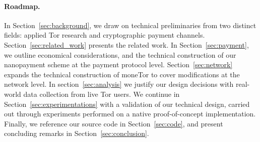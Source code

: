 \paragraph*{Roadmap.} In Section~\ref{sec:background}, we draw on technical
preliminaries from two distinct fields: applied Tor research and cryptographic
payment channels. Section~\ref{sec:related_work} presents the related work.
In Section~\ref{sec:payment}, we outline economical considerations, and the technical construction of
our nanopayment scheme at the payment protocol level. Section~\ref{sec:network}
expands the technical construction of moneTor to cover modifications at the
network level. In section~\ref{sec:analysis} we justify our design decisions
with real-world data collection from live Tor users. We continue in
Section~\ref{sec:experimentations} with a validation of our technical design,
carried out through experiments performed on a native proof-of-concept
implementation. Finally, we reference our source code in
Section~\ref{sec:code}, and present concluding remarks in
Section~\ref{sec:conclusion}.

